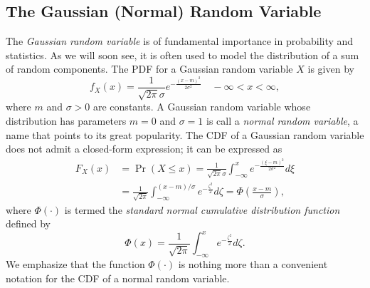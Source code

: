 \subsection{The Gaussian (Normal) Random Variable}

The \emph{Gaussian random variable} is of fundamental importance in probability and statistics. 
As we will soon see, it is often used to model the distribution of a sum of random components.
The PDF for a Gaussian random variable $X$ is given by
\begin{equation*}
f_X (x) = \frac{1}{\sqrt{2 \pi} \sigma} e^{- \frac{(x - m)^2}{2 \sigma^2}}
\quad - \infty < x < \infty,
\end{equation*}
where $m$ and $\sigma > 0$ are constants.
A Gaussian random variable whose distribution has parameters $m = 0$ and $\sigma = 1$ is call a \emph{normal random variable}, a name that points to its great popularity. 
The CDF of a Gaussian random variable does not admit a closed-form expression; it can be expressed as
\begin{equation*}
\begin{split}
F_X (x) &= \Pr (X \leq x)
= \frac{1}{\sqrt{2 \pi} \sigma}
\int_{- \infty}^{x} e^{- \frac{(\xi - m)^2}{2 \sigma^2}} d\xi \\
&= \frac{1}{\sqrt{2 \pi}}
\int_{- \infty}^{(x - m)/\sigma} e^{- \frac{\zeta^2}{2}} d\zeta
= \Phi \left( \frac{x - m}{\sigma} \right),
\end{split}
\end{equation*}
where $\Phi (\cdot)$ is termed the \emph{standard normal cumulative distribution function} defined by
\begin{equation*}
\Phi (x) = 
\frac{1}{\sqrt{2 \pi}} \int_{-\infty}^x e^{-\frac{\zeta^2}{2}} d\zeta .
\end{equation*}
We emphasize that the function $\Phi (\cdot)$ is nothing more than a convenient notation for the CDF of a normal random variable.

